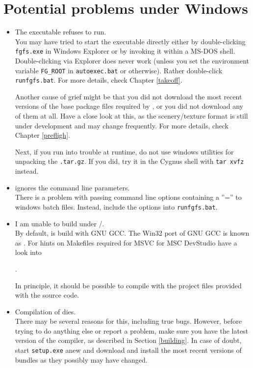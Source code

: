 \section{Potential problems under Windows}
\begin{itemize}
\item{The executable refuses to run.}\\
 You may have tried to start the executable directly either by
 double-clicking \texttt{fgfs.exe} in Windows Explorer or by invoking it
 within a MS-DOS shell. Double-clicking via Explorer does never work
 (unless you set the environment variable \texttt{FG\_ROOT}
 in \texttt{autoexec.bat} or otherwise). Rather double-click \texttt{runfgfs.bat}.
  For more details, check Chapter \ref{takeoff}.

 Another cause of grief might be that you did not download the
 most recent versions of the base package files required by \FlightGear{}$\!$, or
 you did not download any of them at all. Have a close look
 at this, as the scenery/texture format is still under development and may
 change frequently.  For more details, check Chapter \ref{prefligh}.

 Next, if you run into trouble at runtime, do not use windows utilities for unpacking the
 \texttt{.tar.gz}. If you did, try it in the Cygnus shell with \texttt{tar xvfz}
 instead.

\item{\FlightGear{} ignores the command line parameters.}\\
 There is a problem with passing command line options containing a
 ''='' to windows batch files. Instead, include the options into
 \texttt{runfgfs.bat}.

\item{I am unable to build \FlightGear{} under /.}\\
 By default, \FlightGear{} is build with GNU GCC. The Win32 port of GNU GCC is known as
 . For hints on Makefiles
 required for MSVC for MSC DevStudio have a look into
  \medskip

 .
  \medskip

 \noindent
In principle, it should be possible to compile \FlightGear{} with the project files provided with the source code.

\item{Compilation of \FlightGear{} dies.}\\
 There may be several reasons for this, including true bugs. However, before trying to do
 anything else or report a problem, make sure you have the latest version of the
 \Cygwin{} compiler, as described in Section \ref{building}. In case of doubt, start
 \texttt{setup.exe} anew and download and install the most recent versions of bundles
 as they possibly may have changed.
\end{itemize}


